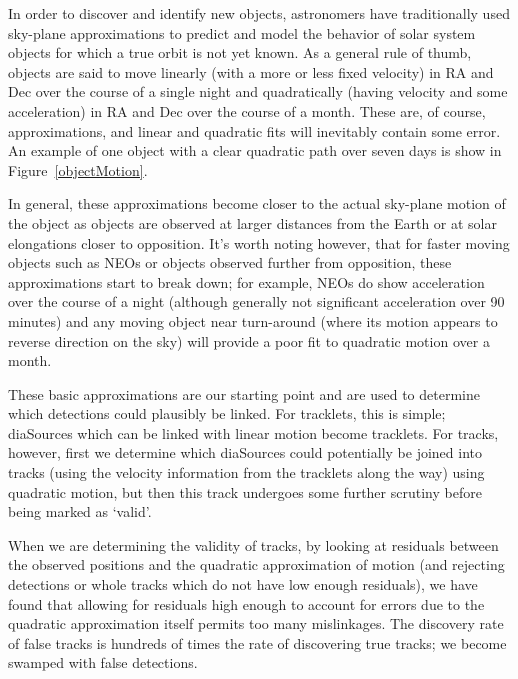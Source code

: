 In order to discover and identify new objects, astronomers have
traditionally used sky-plane approximations to predict and model the
behavior of solar system objects for which a true orbit is not yet
known.  As a general rule of thumb, objects are said to move linearly
(with a more or less fixed velocity) in RA and Dec over the course of
a single night and quadratically (having velocity and some
acceleration) in RA and Dec over the course of a month.  These are, of
course, approximations, and linear and quadratic fits will inevitably
contain some error.  An example of one object with a clear quadratic
path over seven days is show in Figure~\ref{objectMotion}.

In general, these approximations become closer to the actual sky-plane
motion of the object as objects are observed at larger distances from
the Earth or at solar elongations closer to opposition. It's worth
noting however, that for faster moving objects such as NEOs or objects
observed further from opposition, these approximations start to break
down; for example, NEOs do show acceleration over the course of a
night (although generally not significant acceleration over 90
minutes) and any moving object near turn-around (where its motion
appears to reverse direction on the sky) will provide a poor fit to
quadratic motion over a month.

These basic approximations are our starting point and are used to determine
which detections could plausibly be linked. For tracklets, this is
simple; diaSources which can be linked with linear motion become
tracklets. For tracks, however, first we determine which diaSources
could potentially be joined into tracks (using the velocity
information from the tracklets along the way) using quadratic motion,
but then this track undergoes some further scrutiny before being
marked as `valid'. 

When we are determining the validity of tracks, by looking at
residuals between the observed positions and the quadratic
approximation of motion (and rejecting detections or whole tracks
which do not have low enough residuals), we have found that allowing
for residuals high enough to account for errors due to the quadratic
approximation itself permits too many mislinkages. The discovery rate of
false tracks is hundreds of times the rate of discovering true tracks;
we become swamped with false detections. 

